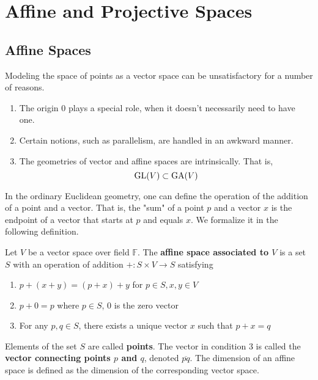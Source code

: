 \section{Affine and Projective Spaces}

\subsection{Affine Spaces}

  Modeling the space of points as a vector space can be unsatisfactory for a number of reasons. 
  \begin{enumerate}
    \item The origin $0$ plays a special role, when it doesn't necessarily need to have one. 
    \item Certain notions, such as parallelism, are handled in an awkward manner. 
    \item The geometries of vector and affine spaces are intrinsically. That is, 
      \begin{equation}
        \operatorname{GL}(V) \subset \operatorname{GA}(V)
      \end{equation}
  \end{enumerate}

  In the ordinary Euclidean geometry, one can define the operation of the addition of a point and a vector. That is, the "sum" of a point $p$ and a vector $x$ is the endpoint of a vector that starts at $p$ and equals $x$. We formalize it in the following definition. 

  \begin{definition}
    Let $V$ be a vector space over field $\mathbb{F}$. The \textbf{affine space associated to $V$} is a set $S$ with an operation of addition $+: S \times V \longrightarrow S$ satisfying 
    \begin{enumerate}
      \item $p + (x + y) = (p + x) + y$ for $p \in S, x, y \in V$
      \item $p + 0 = p$ where $p \in S$, $0$ is the zero vector 
      \item For any $p, q \in S$, there exists a unique vector $x$ such that $p + x = q$
    \end{enumerate}
    Elements of the set $S$ are called \textbf{points}. The vector in condition 3 is called the \textbf{vector connecting points $p$ and $q$}, denoted $\overline{pq}$. The dimension of an affine space is defined as the dimension of the corresponding vector space. 
  \end{definition}

